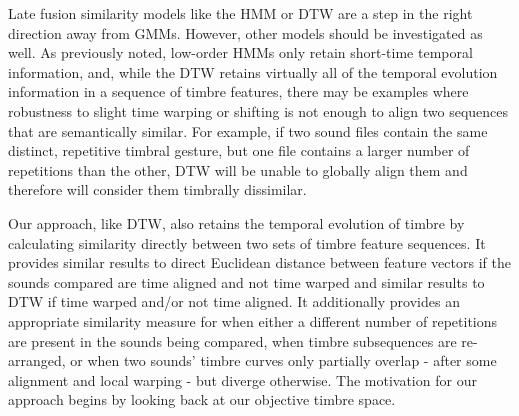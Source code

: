 \documentclass[12pt]{report} 	%
\numberwithin{figure}{chapter}
\numberwithin{table}{chapter}
\numberwithin{equation}{chapter}
\begin{document}
\begin{flushleft}
Late fusion similarity models like the HMM or DTW are a step in the right direction away from GMMs. However, other models should be investigated as well. As previously noted, low-order HMMs only retain short-time temporal information, and, while the DTW retains virtually all of the temporal evolution information in a sequence of timbre features, there may be examples where robustness to slight time warping or shifting is not enough to align two sequences that are semantically similar. For example, if two sound files contain the same distinct, repetitive timbral gesture, but one file contains a larger number of repetitions than the other, DTW will be unable to globally align them and therefore will consider them timbrally dissimilar.

Our approach, like DTW, also retains the temporal evolution of timbre by calculating similarity directly between two sets of timbre feature sequences. It provides similar results to direct Euclidean distance between feature vectors if the sounds compared are time aligned and not time warped and similar results to DTW if time warped and/or not time aligned. It additionally provides an appropriate similarity measure for when either a different number of repetitions are present in the sounds being compared, when timbre subsequences are re-arranged, or when two sounds' timbre curves only partially overlap - after some alignment and local warping - but diverge otherwise. The motivation for our approach begins by looking back at our objective timbre space.


\end{flushleft}
\end{document}
